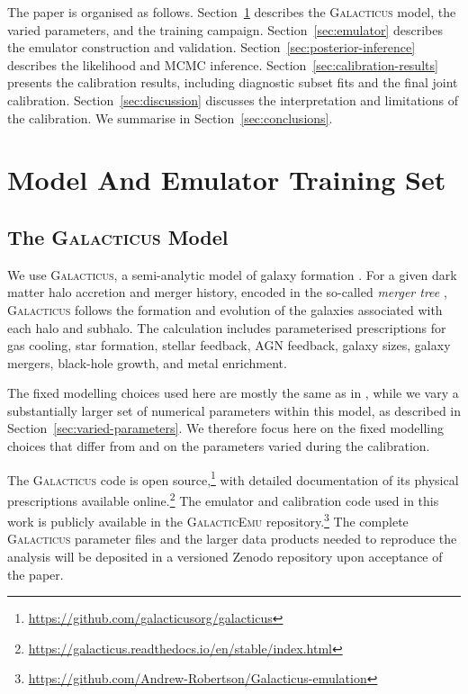 \documentclass[twocolumn, apj, numberedappendix, iop]{openjournal}
\newcommand{\galacticus}{\textsc{Galacticus}\xspace}
\begin{document}
The paper is organised as follows.
Section~\ref{sec:model} describes the \galacticus{} model, the varied parameters, and the training campaign.
Section~\ref{sec:emulator} describes the emulator construction and validation.
Section~\ref{sec:posterior-inference} describes the likelihood and MCMC inference.
Section~\ref{sec:calibration-results} presents the calibration results, including diagnostic subset fits and the final joint calibration.
Section~\ref{sec:discussion} discusses the interpretation and limitations of the calibration.
We summarise in Section~\ref{sec:conclusions}.


\section{Model And Emulator Training Set}
\label{sec:model}

\subsection{The \galacticus{} Model}

We use \galacticus{}, a semi-analytic model of galaxy formation \citep{2012NewA...17..175B}.
For a given dark matter halo accretion and merger history, encoded in the so-called \emph{merger tree} \citep{1993MNRAS.262..627L}, \galacticus{} follows the formation and evolution of the galaxies associated with each halo and subhalo.
The calculation includes parameterised prescriptions for gas cooling, star formation, stellar feedback, AGN feedback, galaxy sizes, galaxy mergers, black-hole growth, and metal enrichment.

The fixed modelling choices used here are mostly the same as in
\citet{2026OJAp....955306R}, while we vary a substantially larger set of
numerical parameters within this model, as described in
Section~\ref{sec:varied-parameters}. We therefore focus here on the fixed
modelling choices that differ from \citet{2026OJAp....955306R} and on the
parameters varied during the calibration.

The \galacticus{} code is open source,\footnote{\href{https://github.com/galacticusorg/galacticus}{https://github.com/galacticusorg/galacticus}} with detailed documentation of its physical prescriptions available online.\footnote{\href{https://galacticus.readthedocs.io/en/stable/index.html}{https://galacticus.readthedocs.io/en/stable/index.html}}
The emulator and calibration code used in this work is publicly available in
the \textsc{GalacticEmu} repository.\footnote{\href{https://github.com/Andrew-Robertson/Galacticus-emulation}{https://github.com/Andrew-Robertson/Galacticus-emulation}}
The complete \galacticus{} parameter files and the larger data products needed
to reproduce the analysis will be deposited in a versioned Zenodo repository
upon acceptance of the paper.
\end{document}
